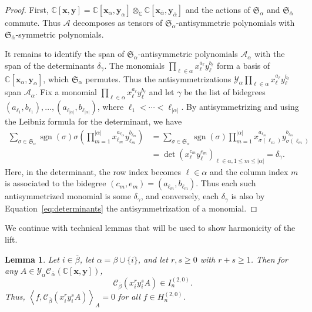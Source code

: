 \documentclass[11pt, noadjust, reqno]{amsart}
\newtheorem{lemma}[theorem]{Lemma}
\theoremstyle{definition}
\theoremstyle{remark}
\numberwithin{equation}{section}
\newcommand{\0}{\emptyset}
\newcommand{\C}{\mathbb{C}}
\newcommand{\cC}{\mathcal{C}}
\newcommand{\cY}{\mathcal{Y}}
\DeclareMathOperator{\sgn}{sgn}
\begin{document}
\begin{proof}
    First, $\C[\bm{x}, \bm{y}] = \C[\bm{x}_{\alpha}, \bm{y}_{\alpha}] \otimes_\C \C[\bm{x}_{\overline{\alpha}}, \bm{y}_{\overline{\alpha}}]$ and the actions of $\mathfrak{S}_{\alpha}$ and $\mathfrak{S}_{\overline{\alpha}}$ commute. 
    Thus $\mathcal A$ decomposes as tensors of $\mathfrak{S}_{\alpha}$-antisymmetric polynomials with $\mathfrak{S}_{\overline{\alpha}}$-symmetric polynomials.

    It remains to identify the span of $\mathfrak{S}_{\alpha}$-antisymmetric polynomials $\mathcal{A}_{\alpha}$ with the span of the determinants $\delta_\gamma$.
    The monomials $\prod_{\ell \in {\alpha}} x_\ell^{a_\ell} y_\ell^{b_\ell}$ form a basis of $\C[\bm{x}_{\alpha},\bm{y}_{\alpha}]$, which $\mathfrak{S}_{\alpha}$ permutes.
    Thus the antisymmetrizations $\cY_{\alpha} \prod_{\ell \in {\alpha}} x_\ell^{a_\ell} y_\ell^{b_\ell}$ span $\mathcal{A}_{\alpha}$.
    Fix a monomial $\prod_{\ell \in {\alpha}} x_\ell^{a_\ell} y_\ell^{b_\ell}$ and let $\gamma$ be the list of bidegrees $(a_{\ell_1},b_{\ell_1}),\ldots, (a_{\ell_{|{\alpha}|}},b_{\ell_{|{\alpha}|}})$, where $\ell_1 < \cdots < \ell_{|{\alpha}|}$.
    By antisymmetrizing and using the Leibniz formula for the determinant, we have
    \begin{align}\label{eq:determinants}
        \sum_{\sigma \in \mathfrak{S}_{\alpha}} \sgn(\sigma) \sigma \left(\prod_{m=1}^{|{\alpha}|} x_{\ell_m}^{a_{\ell_m}}y_{\ell_m}^{b_{\ell_m}} \right) &= \sum_{\sigma \in \mathfrak{S}_{\alpha}} \sgn(\sigma) \prod_{m=1}^{|{\alpha}|} x_{\sigma(\ell_m)}^{a_{\ell_m}} y_{\sigma(\ell_m)}^{b_{\ell_m}} \\
        &= \det (x_\ell^{c_m} y_\ell^{e_m})_{\ell \in {\alpha}, 1 \leq m \leq |{\alpha}|} = \delta_\gamma. \nonumber 
    \end{align}
    Here, in the determinant, the row index becomes $\ell \in {\alpha}$ and the column index $m$ is associated to the bidegree $(c_m,e_m) = (a_{\ell_m}, b_{\ell_m})$.
    Thus each such antisymmetrized monomial is some $\delta_\gamma$, and conversely, each $\delta_\gamma$ is also by Equation~\eqref{eq:determinants} the antisymmetrization of a monomial. 
\end{proof}

We continue with technical lemmas that will be used to show harmonicity of the lift.
\begin{lemma}\label{lem:ideal-membership} Let $i \in \overline{\beta}$, let $\alpha = \beta \cup \{i\}$, and let $r,s \geq 0$ with $r+s \geq 1$. 
Then for any $A \in \cY_\alpha \cC_{\overline{\alpha}}(\C[\bm{x},\bm{y}])$, 
    \begin{equation*}\label{eq:claim-ideal-membership}
        \cC_{\overline{\beta}}(x_i^r y_i^s A) \in I_n^{(2,0)}. 
    \end{equation*}
    Thus, $\left\langle f, \cC_{\overline{\beta}}(x_i^r y_i^s A)\right\rangle_A =0$ for all $f \in H_n^{(2,0)}$.
\end{lemma}
\end{document}
